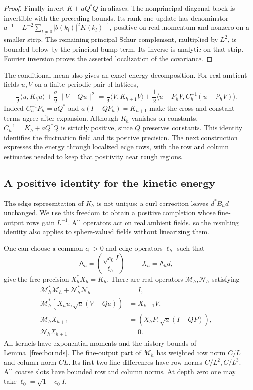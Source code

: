 \begin{proof}
Finally invert $K+aQ^*Q$ in aliases. The nonprincipal diagonal block is
invertible with the preceding bounds. Its rank-one update has
denominator
$a^{-1}+L^{-2}\sum_{l\ne0}|b(k_l)|^2K(k_l)^{-1}$, positive on real
momentum and nonzero on a smaller strip. The remaining principal Schur
complement, multiplied by $L^2$, is bounded below by the principal bump
term. Its inverse is analytic on that strip. Fourier inversion proves
the asserted localization of the covariance.
\end{proof}

The conditional mean also gives an exact energy decomposition. For real
ambient fields $u,V$ on a finite periodic pair of lattices,
\begin{equation}
 \frac12\langle u,K_hu\rangle+\frac a2\|V-Qu\|^2
 =\frac12\langle V,K_{h+1}V\rangle
  +\frac12\langle u-P_hV,C_h^{-1}(u-P_hV)\rangle.
 \label{free:schur-energy}
\end{equation}
Indeed $C_h^{-1}P_h=aQ^*$ and $a(I-QP_h)=K_{h+1}$ make the
cross and constant terms agree after expansion. Although $K_h$ vanishes
on constants, $C_h^{-1}=K_h+aQ^*Q$ is strictly positive, since $Q$
preserves constants. This identity identifies
the fluctuation field and its positive precision. The next construction
expresses the energy through localized edge rows, with the row and
column estimates needed to keep that positivity near rough regions.

\subsection{A positive identity for the kinetic energy}

The edge representation of $K_h$ is not unique: a curl correction leaves
$d^*B_hd$ unchanged. We use this freedom to obtain a positive completion
whose fine-output rows gain $L^{-1}$. All operators act on real ambient
fields, so the resulting identity also applies to sphere-valued fields
without linearizing them.

\begin{lemma}
\label{lem:free-stack}
One can choose a common $c_0>0$ and edge operators $\ell_h$ such that
\[
 \mathsf A_h=\binom{\sqrt{c_0}I}{\ell_h},\qquad X_h=\mathsf A_hd,
\]
give the free precision $X_h^*X_h=K_h$. There are real operators
$\mathcal M_h,\mathcal N_h$ satisfying
\begin{align}
 \mathcal M_h^*\mathcal M_h+\mathcal N_h^*\mathcal N_h&=I,
 \label{free:isometry}\\
 \mathcal M_h^*(X_hu,\sqrt a(V-Qu))&=X_{h+1}V,
 \label{free:ambient}\\
 \mathcal M_hX_{h+1}&=(X_hP,\sqrt a(I-QP)),
 \label{free:harmonic}\\
 \mathcal N_hX_{h+1}&=0.
 \label{free:null}
\end{align}
All kernels have exponential moments and the history bounds of
Lemma~\ref{free:bounds}. The fine-output part of $\mathcal M_h$ has
weighted row norm $C/L$ and column norm $CL$. Its first two fine
differences have row norms $C/L^2,C/L^3$. All coarse slots have bounded
row and column norms. At depth zero one may take
$\ell_0=\sqrt{1-c_0}I$.
\end{lemma}

